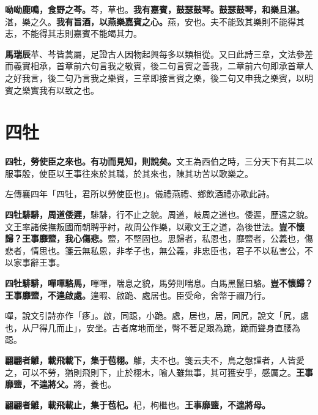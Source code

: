 \textbf{呦呦鹿鳴，食野之芩。}{\footnotesize 芩，草也。}\textbf{我有嘉賓，鼓瑟鼓琴。鼓瑟鼓琴，和樂且湛。}{\footnotesize 湛，樂之久。}\textbf{我有旨酒，以燕樂嘉賓之心。}{\footnotesize 燕，安也。夫不能致其樂則不能得其志，不能得其志則嘉賓不能竭其力。}

\begin{quoting}\textbf{馬瑞辰}苹、芩皆蒿屬，足證古人因物起興每多以類相從。又曰此詩三章，文法參差而義實相承，首章前六句言我之敬賓，後二句言賓之善我，二章前六句即承首章人之好我言，後二句乃言我之樂賓，三章即接言賓之樂，後二句又申我之樂賓，以明賓之樂實我有以致之也。\end{quoting}

\section{四牡}


\textbf{四牡，勞使臣之來也。有功而見知，則說矣。}{\footnotesize 文王為西伯之時，三分天下有其二以服事殷，使臣以王事往來於其職，於其來也，陳其功苦以歌樂之。}

\begin{quoting}左傳襄四年「四牡，君所以勞使臣也」。儀禮燕禮、鄉飲酒禮亦歌此詩。\end{quoting}

\textbf{四牡騑騑，周道倭遲，}{\footnotesize 騑騑，行不止之貌。周道，岐周之道也。倭遲，歷遠之貌。文王率諸侯撫叛國而朝聘乎紂，故周公作樂，以歌文王之道，為後世法。}\textbf{豈不懷歸？王事靡盬，我心傷悲。}{\footnotesize 盬，不堅固也。思歸者，私恩也，靡盬者，公義也，傷悲者，情思也。箋云無私恩，非孝子也，無公義，非忠臣也，君子不以私害公，不以家事辭王事。}

\textbf{四牡騑騑，嘽嘽駱馬，}{\footnotesize 嘽嘽，喘息之貌，馬勞則喘息。白馬黑鬣曰駱。}\textbf{豈不懷歸？王事靡盬，不遑啟處。}{\footnotesize 遑暇、啟跪、處居也。臣受命，舍幣于禰乃行。}

\begin{quoting}嘽，說文引詩亦作「痑」。啟，同跽，小跪。處，居也，居，同凥，說文「凥，處也，从尸得几而止」，安坐。古者席地而坐，臀不著足跟為跪，跪而聳身直腰為跽。\end{quoting}

\textbf{翩翩者鵻，載飛載下，集于苞栩。}{\footnotesize 鵻，夫不也。箋云夫不，鳥之愨謹者，人皆愛之，可以不勞，猶則飛則下，止於栩木，喻人雖無事，其可獲安乎，感厲之。}\textbf{王事靡盬，不遑將父。}{\footnotesize 將，養也。}

\textbf{翩翩者鵻，載飛載止，集于苞杞。}{\footnotesize 杞，枸檵也。}\textbf{王事靡盬，不遑將母。}

